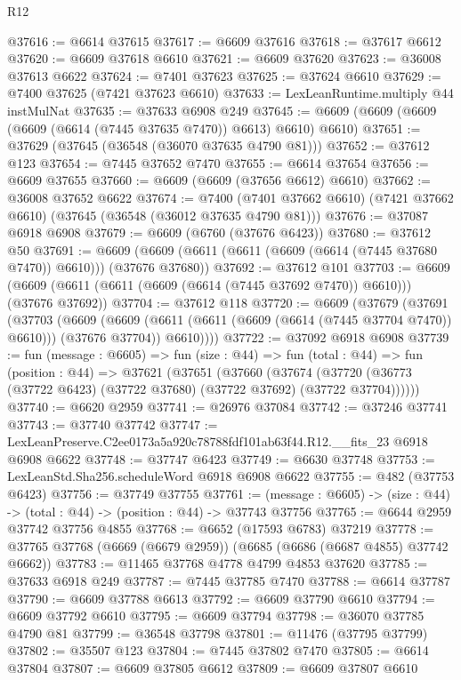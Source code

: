 \begin{lexlean}{R12}
\begin{coremodule}
@37616 := @6614 @37615
@37617 := @6609 @37616
@37618 := @37617 @6612
@37620 := @6609 @37618 @6610
@37621 := @6609 @37620
@37623 := @36008 @37613 @6622
@37624 := @7401 @37623
@37625 := @37624 @6610
@37629 := @7400 @37625 (@7421 @37623 @6610)
@37633 := LexLeanRuntime.multiply @44 instMulNat
@37635 := @37633 @6908 @249
@37645 := @6609 (@6609 (@6609 (@6609 (@6614 (@7445 @37635 @7470)) @6613) @6610) @6610)
@37651 := @37629 (@37645 (@36548 (@36070 @37635 @4790 @81)))
@37652 := @37612 @123
@37654 := @7445 @37652 @7470
@37655 := @6614 @37654
@37656 := @6609 @37655
@37660 := @6609 (@6609 (@37656 @6612) @6610)
@37662 := @36008 @37652 @6622
@37674 := @7400
    (@7401 @37662 @6610)
    (@7421 @37662 @6610)
    (@37645 (@36548 (@36012 @37635 @4790 @81)))
@37676 := @37087 @6918 @6908
@37679 := @6609 (@6760 (@37676 @6423))
@37680 := @37612 @50
@37691 := @6609 (@6609 (@6611 (@6611 (@6609 (@6614 (@7445 @37680 @7470)) @6610))) (@37676 @37680))
@37692 := @37612 @101
@37703 := @6609 (@6609 (@6611 (@6611 (@6609 (@6614 (@7445 @37692 @7470)) @6610))) (@37676 @37692))
@37704 := @37612 @118
@37720 := @6609
    (@37679
      (@37691
        (@37703
          (@6609
            (@6609 (@6611 (@6611 (@6609 (@6614 (@7445 @37704 @7470)) @6610))) (@37676 @37704))
            @6610))))
@37722 := @37092 @6918 @6908
@37739 := fun (message : @6605) =>
  fun (size : @44) =>
  fun (total : @44) =>
  fun (position : @44) =>
  @37621
    (@37651
      (@37660
        (@37674 (@37720 (@36773 (@37722 @6423) (@37722 @37680) (@37722 @37692) (@37722 @37704))))))
@37740 := @6620 @2959
@37741 := @26976 @37084
@37742 := @37246 @37741
@37743 := @37740 @37742
@37747 := LexLeanPreserve.C2ee0173a5a920c78788fdf101ab63f44.R12.__fits_23 @6918 @6908 @6622
@37748 := @37747 @6423
@37749 := @6630 @37748
@37753 := LexLeanStd.Sha256.scheduleWord @6918 @6908 @6622
@37755 := @482 (@37753 @6423)
@37756 := @37749 @37755
@37761 := (message : @6605) -> (size : @44) -> (total : @44) -> (position : @44) -> @37743 @37756
@37765 := @6644 @2959 @37742 @37756 @4855
@37768 := @6652 (@17593 @6783) @37219
@37778 := @37765 @37768 (@6669 (@6679 @2959)) (@6685 (@6686 (@6687 @4855) @37742 @6662))
@37783 := @11465 @37768 @4778 @4799 @4853 @37620
@37785 := @37633 @6918 @249
@37787 := @7445 @37785 @7470
@37788 := @6614 @37787
@37790 := @6609 @37788 @6613
@37792 := @6609 @37790 @6610
@37794 := @6609 @37792 @6610
@37795 := @6609 @37794
@37798 := @36070 @37785 @4790 @81
@37799 := @36548 @37798
@37801 := @11476 (@37795 @37799)
@37802 := @35507 @123
@37804 := @7445 @37802 @7470
@37805 := @6614 @37804
@37807 := @6609 @37805 @6612
@37809 := @6609 @37807 @6610

\end{coremodule}
\end{lexlean}
